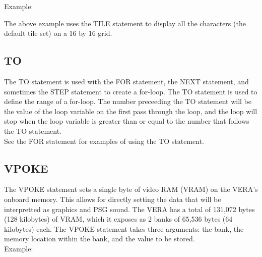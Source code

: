 Example:\\


The above example uses the {\ttfamily TILE} statement to display all the
characters (the default tile set) on a 16 by 16 grid.\\

\subsection{TO}

The {\ttfamily TO} statement is used with the {\ttfamily FOR} statement, the
{\ttfamily NEXT} statement, and sometimes the {\ttfamily STEP} statement to
create a for-loop.  The {\ttfamily TO} statement is used to define the range of
a for-loop.  The number preceeding the {\ttfamily TO} statement will be the
value of the loop variable on the first pass through the loop, and the loop
will stop when the loop variable is greater than or equal to the number that
follows the {\ttfamily TO} statement.\\

See the {\ttfamily FOR} statement for examples of using the {\ttfamily TO}
statement.\\

\subsection{VPOKE}

The {\ttfamily VPOKE} statement sets a single byte of video RAM (VRAM) on the
VERA's onboard memory.  This allows for directly setting the data that will be
interpretted as graphics and PSG sound.  The VERA has a total of 131,072 bytes
(128 kilobytes) of VRAM, which it exposes as 2 banks of 65,536 bytes (64
kilobytes) each.  The {\ttfamily VPOKE} statement takes three arguments: the
bank, the memory location within the bank, and the value to be stored.\\

Example:\\

